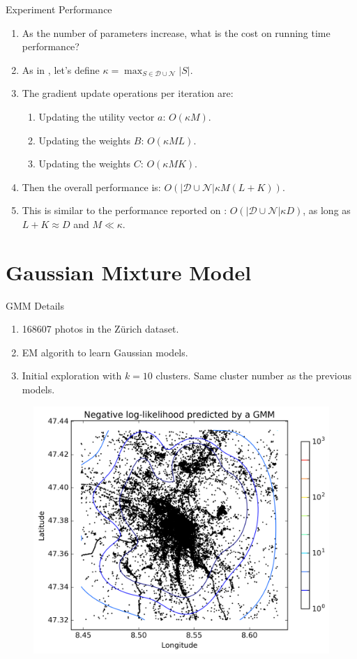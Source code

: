 \documentclass{beamer}
\begin{document}
\begin{frame}{Experiment Performance}
  \begin{enumerate}
    \item As the number of parameters increase, what is the cost on running time performance?
    \item As in \cite{tschiatschek16learning}, let's define $\kappa = \max_{S \in \mathcal{D} \cup \mathcal{N}}|S|$.
    \item The gradient update operations per iteration are:
    \begin{enumerate}
      \item Updating the utility vector $a$: $O(\kappa M)$.
      \item Updating the weights $B$: $O(\kappa M L)$.
      \item Updating the weights $C$: $O(\kappa M K)$.
    \end{enumerate}
    \item Then the overall performance is: $O(|\mathcal{D} \cup \mathcal{N}| \kappa M (L + K))$.
    \item This is similar to the performance reported on \cite{tschiatschek16learning}: $O(|\mathcal{D} \cup \mathcal{N}| \kappa D)$, as long as $L + K \approx D$ and $M \ll \kappa$.
  \end{enumerate}
\end{frame}

\section{Gaussian Mixture Model}

\begin{frame}{GMM Details}
  \begin{enumerate}
    \item 168607 photos in the Zürich dataset.
    \item EM algorith to learn Gaussian models.
    \item Initial exploration with $k = 10$ clusters. Same cluster number as the previous models.
  \end{enumerate}
  \begin{figure}
    \centering
    \includegraphics[width=0.5\columnwidth]{gmm_nlog_likelihood}
  \end{figure}
\end{frame}
\end{document}
